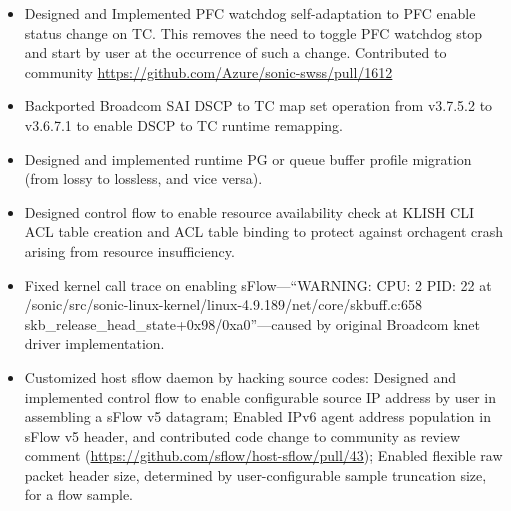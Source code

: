 \documentclass[letterpaper,11pt]{article}
\newcommand{\resitem}[1]{\item #1 \vspace{-2pt}}
\begin{document}
\begin{itemize}
\begin{itemize}
{  This is to conform to vendor CLI convention that smaller rule id is of higher rule priority.}
  \resitem{Designed and Implemented PFC watchdog self-adaptation to PFC enable status change on TC.
  This removes the need to toggle PFC watchdog stop and start by user at the occurrence of such a change. Contributed to community
  \url{https://github.com/Azure/sonic-swss/pull/1612}}
  \resitem{Backported Broadcom SAI DSCP to TC map set operation from v3.7.5.2 to v3.6.7.1 to enable DSCP to TC runtime remapping.}
  \resitem{Designed and implemented runtime PG or queue buffer profile migration (from lossy to lossless, and vice versa).}
  \resitem{Designed control flow to enable resource availability check at KLISH CLI ACL table creation and ACL table binding
  to protect against orchagent crash arising from resource insufficiency.}
  \resitem{%
  Fixed kernel call trace on enabling sFlow---``WARNING: CPU: 2 PID: 22 at /sonic/src/sonic-linux-kernel/linux-4.9.189/net/core/skbuff.c:658 skb\_release\_head\_state+0x98/0xa0''---caused by original Broadcom knet driver implementation.}
  \resitem{Customized host sflow daemon by hacking source codes:
  Designed and implemented control flow to enable configurable source IP address by user in assembling a sFlow v5 datagram;
  Enabled IPv6 agent address population in sFlow v5 header, and contributed code change to community as review comment
  (\url{https://github.com/sflow/host-sflow/pull/43});
  Enabled flexible raw packet header size, determined by user-configurable sample truncation size, for a flow sample.}
  \end{itemize}


\end{itemize}
\end{document}
